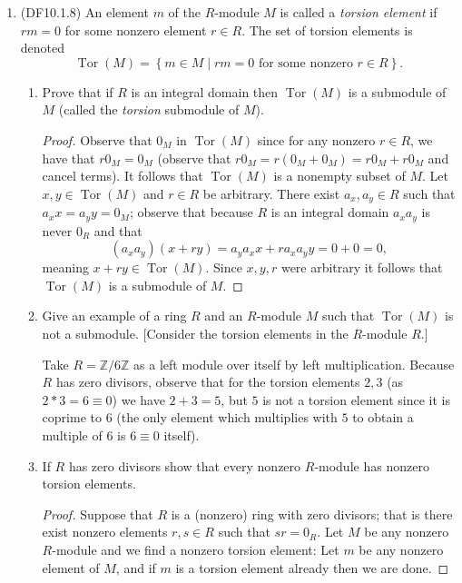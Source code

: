 \documentclass[11pt]{article}
\newcommand{\cbr}[1]{\left\{#1\right\}}
\DeclareMathOperator{\Tor}{Tor}
\begin{document}
\begin{enumerate}
    \item (DF10.1.8) An element $m$ of the $R$-module $M$ is called a \textit{torsion element} if $rm = 0$ for some nonzero element $r\in R$. The set of torsion elements is denoted \[\Tor(M) = \cbr{m\in M\mid rm=0 \text{ for some nonzero $r\in R$}}.\] \begin{enumerate}[label=\textbf{(\alph*)}]
      \item Prove that if $R$ is an integral domain then $\Tor(M)$ is a submodule of $M$ (called the \textit{torsion} submodule of $M$). \begin{proof}
        Observe that $0_M$ in $\Tor(M)$ since for any nonzero $r\in R$, we have that $r0_M = 0_M$ (observe that $r0_M = r(0_M + 0_M) = r0_M + r0_M$ and cancel terms). It follows that $\Tor(M)$ is a nonempty subset of $M$. Let $x,y\in \Tor(M)$ and $r\in R$ be arbitrary. There exist $a_x, a_y\in R$ such that $a_x x = a_y y = 0_M$; observe that because $R$ is an integral domain $a_xa_y$ is never $0_R$ and that \[(a_xa_y)(x+ry) = a_ya_xx + ra_xa_yy = 0 + 0 = 0,\] meaning $x+ry\in \Tor(M)$. Since $x,y,r$ were arbitrary it follows that $\Tor(M)$ is a submodule of $M$.
      \end{proof}
      \item Give an example of a ring $R$ and an $R$-module $M$ such that $\Tor(M)$ is not a submodule. [Consider the torsion elements in the $R$-module $R$.] 
      
      Take $R = \mathbb{Z}/6\mathbb{Z}$ as a left module over itself by left multiplication. Because $R$ has zero divisors, observe that for the torsion elements $2,3$ (as $2*3 = 6\equiv 0$) we have $2+3 = 5$, but $5$ is not a torsion element since it is coprime to $6$ (the only element which multiplies with $5$ to obtain a multiple of $6$ is $6 \equiv 0$ itself).
      \item If $R$ has zero divisors show that every nonzero $R$-module has nonzero torsion elements. \begin{proof}
        Suppose that $R$ is a (nonzero) ring with zero divisors; that is there exist nonzero elements $r,s \in R$ such that $sr = 0_R$. Let $M$ be any nonzero $R$-module and we find a nonzero torsion element: Let $m$ be any nonzero element of $M$, and if $m$ is a torsion element already then we are done.
        

\end{proof}
\end{enumerate}
\end{enumerate}
\end{document}
